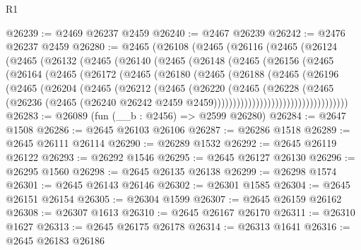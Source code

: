 \begin{lexlean}{R1}
\begin{coremodule}
@26239 := @2469 @26237 @2459
@26240 := @2467 @26239
@26242 := @2476 @26237 @2459
@26280 := @2465
    (@26108
      (@2465
        (@26116
          (@2465
            (@26124
              (@2465
                (@26132
                  (@2465
                    (@26140
                      (@2465
                        (@26148
                          (@2465
                            (@26156
                              (@2465
                                (@26164
                                  (@2465
                                    (@26172
                                      (@2465
                                        (@26180
                                          (@2465
                                            (@26188
                                              (@2465
                                                (@26196
                                                  (@2465
                                                    (@26204
                                                      (@2465
                                                        (@26212
                                                          (@2465
                                                            (@26220
                                                              (@2465
                                                                (@26228
                                                                  (@2465
                                                                    (@26236
                                                                      (@2465
                                                                        (@26240
                                                                          @26242
                                                                          @2459
                                                                          @2459)))))))))))))))))))))))))))))))))))
@26283 := @26089 (fun (__b : @2456) => @2599 @26280)
@26284 := @2647 @1508
@26286 := @2645 @26103 @26106
@26287 := @26286 @1518
@26289 := @2645 @26111 @26114
@26290 := @26289 @1532
@26292 := @2645 @26119 @26122
@26293 := @26292 @1546
@26295 := @2645 @26127 @26130
@26296 := @26295 @1560
@26298 := @2645 @26135 @26138
@26299 := @26298 @1574
@26301 := @2645 @26143 @26146
@26302 := @26301 @1585
@26304 := @2645 @26151 @26154
@26305 := @26304 @1599
@26307 := @2645 @26159 @26162
@26308 := @26307 @1613
@26310 := @2645 @26167 @26170
@26311 := @26310 @1627
@26313 := @2645 @26175 @26178
@26314 := @26313 @1641
@26316 := @2645 @26183 @26186

\end{coremodule}
\end{lexlean}
